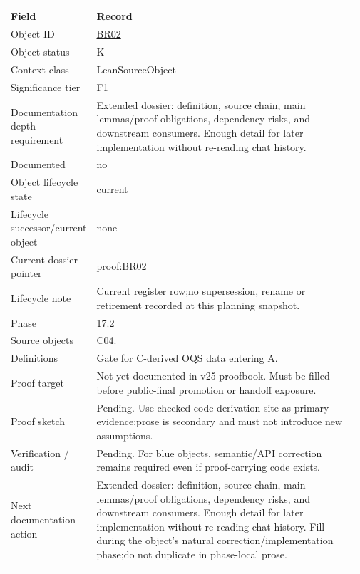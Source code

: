 \begin{longtable}{L{0.16\linewidth} L{0.81\linewidth}}
\hline
\textbf{Field} & \textbf{Record}\\
\hline
Object ID & \hyperlink{object-row-BR02}{BR02}\\
\hline\addlinespace[0.20em]
Object status & K\\
\hline\addlinespace[0.20em]
Context class & LeanSourceObject\\
\hline\addlinespace[0.20em]
Significance tier & F1\\
\hline\addlinespace[0.20em]
Documentation depth requirement & Extended dossier: definition, source chain, main lemmas/\allowbreak{}proof obligations, dependency risks, and downstream consumers. Enough detail for later implementation without re-reading chat history.\\
\hline\addlinespace[0.20em]
Documented & no\\
\hline\addlinespace[0.20em]
Object lifecycle state & current\\
\hline\addlinespace[0.20em]
Lifecycle successor/\allowbreak{}current object & none\\
\hline\addlinespace[0.20em]
Current dossier pointer & proof:BR02\\
\hline\addlinespace[0.20em]
Lifecycle note & Current register row;\newline no supersession, rename or retirement recorded at this planning snapshot.\\
\hline\addlinespace[0.20em]
Phase & \hyperlink{phase-row-17-2}{17.2}\\
\hline\addlinespace[0.20em]
Source objects & C04.\\
\hline\addlinespace[0.20em]
Definitions & Gate for C-derived OQS data entering A.\\
\hline\addlinespace[0.20em]
Proof target & Not yet documented in v25 proofbook. Must be filled before public-final promotion or handoff exposure.\\
\hline\addlinespace[0.20em]
Proof sketch & Pending. Use checked code derivation site as primary evidence;\newline prose is secondary and must not introduce new assumptions.\\
\hline\addlinespace[0.20em]
Verification /\allowbreak{} audit & Pending. For blue objects, semantic/\allowbreak{}API correction remains required even if proof-carrying code exists.\\
\hline\addlinespace[0.20em]
Next documentation action & Extended dossier: definition, source chain, main lemmas/\allowbreak{}proof obligations, dependency risks, and downstream consumers. Enough detail for later implementation without re-reading chat history. Fill during the object's natural correction/\allowbreak{}implementation phase;\newline do not duplicate in phase-local prose.\\
\hline\addlinespace[0.20em]
\end{longtable}
